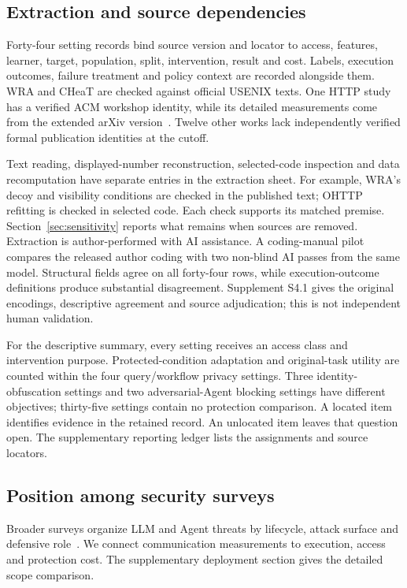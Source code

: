 \subsection{Extraction and source dependencies}
Forty-four setting records bind source version and locator to access, features, learner, target, population, split, intervention, result and cost. Labels, execution outcomes, failure treatment and policy context are recorded alongside them. WRA and CHeaT are checked against official USENIX texts. One HTTP study has a verified ACM workshop identity, while its detailed measurements come from the extended arXiv version~\cite{borysenko2026http,borysenko2026short}. Twelve other works lack independently verified formal publication identities at the cutoff.

Text reading, displayed-number reconstruction, selected-code inspection and data recomputation have separate entries in the extraction sheet. For example, WRA's decoy and visibility conditions are checked in the published text; OHTTP refitting is checked in selected code. Each check supports its matched premise. Section~\ref{sec:sensitivity} reports what remains when sources are removed. Extraction is author-performed with AI assistance. A coding-manual pilot compares the released author coding with two non-blind AI passes from the same model. Structural fields agree on all forty-four rows, while execution-outcome definitions produce substantial disagreement. Supplement S4.1 gives the original encodings, descriptive agreement and source adjudication; this is not independent human validation.

For the descriptive summary, every setting receives an access class and intervention purpose. Protected-condition adaptation and original-task utility are counted within the four query/workflow privacy settings. Three identity-obfuscation settings and two adversarial-Agent blocking settings have different objectives; thirty-five settings contain no protection comparison. A located item identifies evidence in the retained record. An unlocated item leaves that question open. The supplementary reporting ledger lists the assignments and source locators.

\subsection{Position among security surveys}
Broader surveys organize LLM and Agent threats by lifecycle, attack surface and defensive role~\cite{yao2024survey,shahriar2025survey,ferrag2025survey}. We connect communication measurements to execution, access and protection cost. The supplementary deployment section gives the detailed scope comparison.
